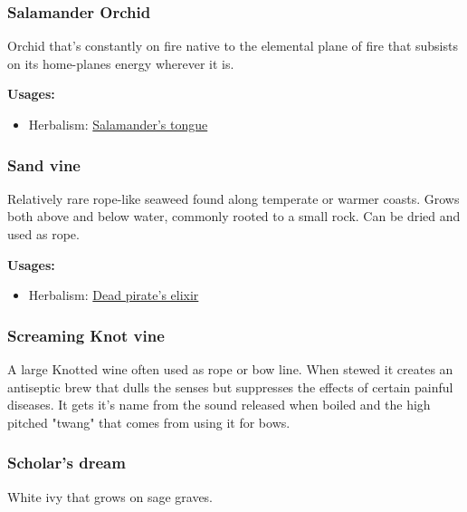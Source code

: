 \subsubsection{Salamander Orchid}
\label{Salamander Orchid}

Orchid that's constantly on fire native to the elemental plane of fire that subsists on its home-planes energy wherever it is.

\vspace{5mm}

\textbf{Usages:}

\begin{itemize}[noitemsep]
\item[] Herbalism: \hyperref[Salamander's tongue]{Salamander's tongue}
\end{itemize}

\subsubsection{Sand vine}
\label{Sand vine}

Relatively rare rope-like seaweed found along temperate or warmer coasts. Grows both above and below water, commonly rooted to a small rock. Can be dried and used as rope.

\vspace{5mm}

\textbf{Usages:}

\begin{itemize}[noitemsep]
\item[] Herbalism: \hyperref[Dead pirate's elixir]{Dead pirate's elixir}
\end{itemize}

\subsubsection{Screaming Knot vine}
\label{screaming_knot_vine}

A large Knotted wine often used as rope or bow line. When stewed it creates an antiseptic brew that dulls the senses but suppresses the effects of certain painful diseases. It gets it's name from the sound released when boiled and the high pitched "twang" that comes from using it for bows.

\subsubsection{Scholar's dream}
\label{Scholar's dream}

White ivy that grows on sage graves.

